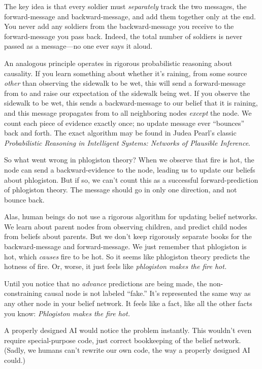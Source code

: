 {
 The key idea is that every soldier must \textit{separately} track
the two messages, the forward-message and backward-message, and add
them together only at the end. You never add any soldiers from the
backward-message you receive to the forward-message you pass back.
Indeed, the total number of soldiers is never passed as a message---no
one ever says it aloud.}

{
 An analogous principle operates in rigorous probabilistic
reasoning about causality. If you learn something about whether
it's raining, from some source \textit{other} than
observing the sidewalk to be wet, this will send a forward-message from
 to  and raise our expectation of the sidewalk being
wet. If you observe the sidewalk to be wet, this sends a
backward-message to our belief that it is raining, and this message
propagates from  to all neighboring nodes \textit{except} the
 node. We count each piece of evidence exactly once; no
update message ever ``bounces'' back
and forth. The exact algorithm may be found in Judea
Pearl's classic \textit{Probabilistic Reasoning in
Intelligent Systems: Networks of Plausible Inference}.}

{
 So what went wrong in phlogiston theory? When we observe that fire
is hot, the  node can send a backward-evidence to the 
node, leading us to update our beliefs about phlogiston. But if so, we
can't count this as a successful forward-prediction of
phlogiston theory. The message should go in only one direction, and not
bounce back.}

{
 Alas, human beings do not use a rigorous algorithm for updating
belief networks. We learn about parent nodes from observing children,
and predict child nodes from beliefs about parents. But we
don't keep rigorously separate books for the
backward-message and forward-message. We just remember that phlogiston
is hot, which \textit{causes} fire to be hot. So it seems like
phlogiston theory predicts the hotness of fire. Or, worse, it just
feels like \textit{phlogiston makes the fire hot.}}

{
 Until you notice that no \textit{advance} predictions are being
made, the non-constraining causal node is not labeled
``fake.'' It's
represented the same way as any other node in your belief network. It
feels like a fact, like all the other facts you know:
\textit{Phlogiston makes the fire hot.}}

{
 A properly designed AI would notice the problem instantly. This
wouldn't even require special-purpose code, just
correct bookkeeping of the belief network. (Sadly, we humans
can't rewrite our own code, the way a properly designed
AI could.)}

